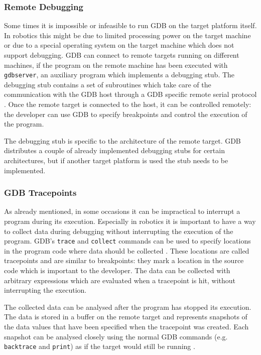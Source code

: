 \subsubsection{Remote Debugging}
Some times it is impossible or infeasible to run GDB on the target platform itself. In robotics this might be due to limited processing power on the target machine or due to a special operating system on the target machine which does not support debugging. GDB can connect to remote targets running on different machines, if the program on the remote machine has been executed with \verb+gdbserver+, an auxiliary program which implements a debugging stub. The debugging stub contains a set of subroutines which take care of the communication with the GDB host through a GDB specific remote serial protocol \cite{Stallman2002}. Once the remote target is connected to the host, it can be controlled remotely: the developer can use GDB to specify breakpoints and control the execution of the program.

The debugging stub is specific to the architecture of the remote target. GDB distributes a couple of already implemented debugging stubs for certain architectures, but if another target platform is used the stub needs to be implemented.

\subsubsection{GDB Tracepoints}
As already mentioned, in some occasions it can be impractical to interrupt a program during its execution. Especially in robotics it is important to have a way to collect data during debugging without interrupting the execution of the program. GDB's \verb+trace+ and \verb+collect+ commands can be used to specify locations in the program code where data should be collected \cite{Stallman2002}. These locations are called tracepoints and are similar to breakpoints: they mark a location in the source code which is important to the developer. The data can be collected with arbitrary expressions which are evaluated when a tracepoint is hit, without interrupting the execution.

The collected data can be analysed after the program has stopped its execution. The data is stored in a buffer on the remote target and represents snapshots of the data values that have been specified when the tracepoint was created. Each snapshot can be analysed closely using the normal GDB commands (e.g. \verb+backtrace+ and \verb+print+) as if the target would still be running \cite{Stallman2002}.

